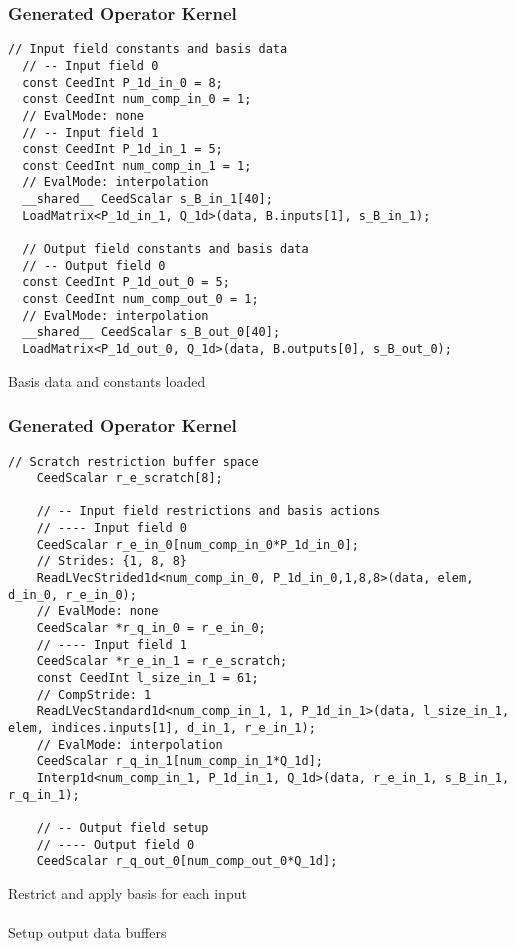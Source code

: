 \documentclass{beamer}
\begin{document}

\begin{frame}[fragile]
\begin{center}
\frametitle{Generated Operator Kernel}

{\tiny
\begin{lstlisting}[style=boxedC]
  // Input field constants and basis data
  // -- Input field 0
  const CeedInt P_1d_in_0 = 8;
  const CeedInt num_comp_in_0 = 1;
  // EvalMode: none
  // -- Input field 1
  const CeedInt P_1d_in_1 = 5;
  const CeedInt num_comp_in_1 = 1;
  // EvalMode: interpolation
  __shared__ CeedScalar s_B_in_1[40];
  LoadMatrix<P_1d_in_1, Q_1d>(data, B.inputs[1], s_B_in_1);

  // Output field constants and basis data
  // -- Output field 0
  const CeedInt P_1d_out_0 = 5;
  const CeedInt num_comp_out_0 = 1;
  // EvalMode: interpolation
  __shared__ CeedScalar s_B_out_0[40];
  LoadMatrix<P_1d_out_0, Q_1d>(data, B.outputs[0], s_B_out_0);
\end{lstlisting}
}

Basis data and constants loaded\\

\end{center}
\end{frame}


\begin{frame}[fragile]
\begin{center}
\frametitle{Generated Operator Kernel}

{\tiny
\begin{lstlisting}[style=boxedC]
    // Scratch restriction buffer space
    CeedScalar r_e_scratch[8];

    // -- Input field restrictions and basis actions
    // ---- Input field 0
    CeedScalar r_e_in_0[num_comp_in_0*P_1d_in_0];
    // Strides: {1, 8, 8}
    ReadLVecStrided1d<num_comp_in_0, P_1d_in_0,1,8,8>(data, elem, d_in_0, r_e_in_0);
    // EvalMode: none
    CeedScalar *r_q_in_0 = r_e_in_0;
    // ---- Input field 1
    CeedScalar *r_e_in_1 = r_e_scratch;
    const CeedInt l_size_in_1 = 61;
    // CompStride: 1
    ReadLVecStandard1d<num_comp_in_1, 1, P_1d_in_1>(data, l_size_in_1, elem, indices.inputs[1], d_in_1, r_e_in_1);
    // EvalMode: interpolation
    CeedScalar r_q_in_1[num_comp_in_1*Q_1d];
    Interp1d<num_comp_in_1, P_1d_in_1, Q_1d>(data, r_e_in_1, s_B_in_1, r_q_in_1);

    // -- Output field setup
    // ---- Output field 0
    CeedScalar r_q_out_0[num_comp_out_0*Q_1d];

\end{lstlisting}
}

Restrict and apply basis for each input\\

~\\

Setup output data buffers\\

\end{center}
\end{frame}
\end{document}

